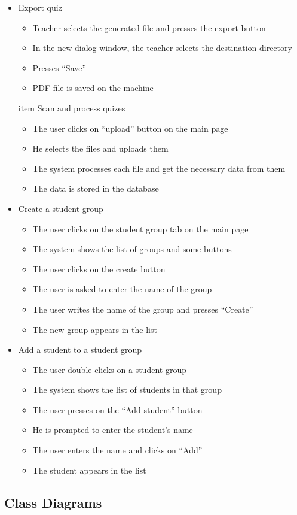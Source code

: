 \begin{itemize}
  \item Export quiz
  \begin{itemize}
    \item Teacher selects the generated file and presses the export button
    \item In the new dialog window, the teacher selects the destination directory
    \item Presses “Save”
    \item PDF file is saved on the machine
  \end{itemize}

  item Scan and process quizes
  \begin{itemize}
    \item The user clicks on “upload” button on the main page
    \item He selects the files and uploads them
    \item The system processes each file and get the necessary data from them
    \item The data is stored in the database
  \end{itemize}

  \item Create a student group
  \begin{itemize}
    \item The user clicks on the student group tab on the main page
    \item The system shows the list of groups and some buttons
    \item The user clicks on the create button
    \item The user is asked to enter the name of the group
    \item The user writes the name of the group and presses “Create”
    \item The new group appears in the list
  \end{itemize}

  \item Add a student to a student group
  \begin{itemize}
    \item The user double-clicks on a student group
    \item The system shows the list of students in that group
    \item The user presses on the “Add student” button
    \item He is prompted to enter the student’s name
    \item The user enters the name and clicks on “Add”
    \item The student appears in the list
  \end{itemize}
\end{itemize}

\subsection{Class Diagrams}
